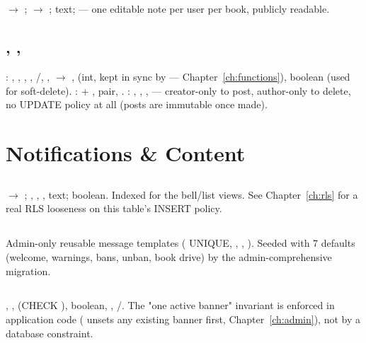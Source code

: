 \subsection*{}
 $\to$ ;  $\to$ ;  text;  — one editable note per user per book, publicly readable.

\subsection*{, , }
: , , , , /, ,  $\to$ ,  (int, kept in sync by  — Chapter~\ref{ch:functions}),  boolean (used for soft-delete). :  + ,  pair, . : , , ,  — creator-only to post, author-only to delete, no UPDATE policy at all (posts are immutable once made).

\section{Notifications \& Content}

\subsection*{}
 $\to$ ; , , ,  text;  boolean. Indexed  for the bell/list views. See Chapter~\ref{ch:rls} for a real RLS looseness on this table's INSERT policy.

\subsection*{}
Admin-only reusable message templates ( UNIQUE, , , ). Seeded with 7 defaults (welcome, warnings, bans, unban, book drive) by the admin-comprehensive migration.

\subsection*{}
, ,  (CHECK ),  boolean, , /. The "one active banner" invariant is enforced in application code ( unsets any existing banner first, Chapter~\ref{ch:admin}), not by a database constraint.

